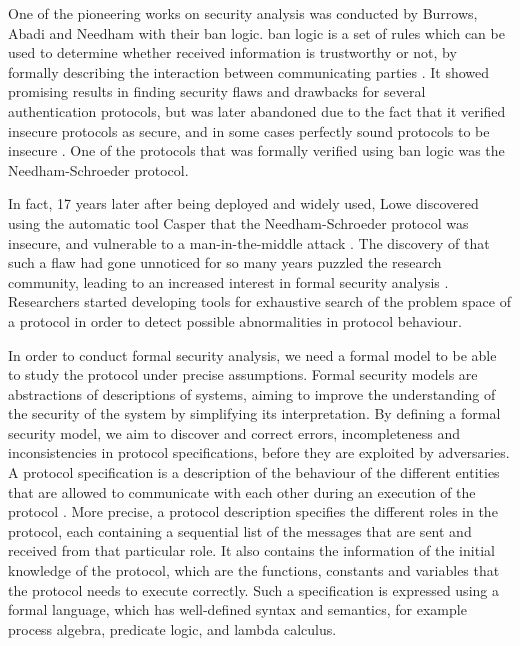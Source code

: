 One of the pioneering works on security analysis was conducted by Burrows, Abadi and Needham with their \gls{ban} logic. \gls{ban} logic is a set of rules which can be used to determine whether received information is trustworthy or not, by formally describing the interaction between communicating parties \cite{burrows1989logic}. It showed promising results in finding security flaws and drawbacks for several authentication protocols, but was later abandoned due to the fact that it verified insecure protocols as secure, and in some cases perfectly sound protocols to be insecure \cite{boyd1993}. One of the protocols that was formally verified using \gls{ban} logic was the Needham-Schroeder protocol.

In fact, 17 years later after being deployed and widely used, Lowe discovered using the automatic tool Casper that the Needham-Schroeder protocol was insecure, and vulnerable to a man-in-the-middle attack \cite{basin2011model} \cite{lowe1996}. The discovery of that such a flaw had gone unnoticed for so many years puzzled the research community, leading to an increased interest in formal security analysis \cite{cremers2009comparing}. Researchers started developing tools for exhaustive search of the problem space of a protocol in order to detect possible abnormalities in protocol behaviour. 


In order to conduct formal security analysis, we need a formal model to be able to study the protocol under precise assumptions. Formal security models are abstractions of descriptions of systems, aiming to improve the understanding of the security of the system by simplifying its interpretation. By defining a formal security model, we aim to discover and correct errors, incompleteness and inconsistencies in protocol specifications, before they are exploited by adversaries. A protocol specification is a description of the behaviour of the different entities that are allowed to communicate with each other during an execution of the protocol \cite{cremers2005operational}. More precise, a protocol description specifies the different roles in the protocol, each containing a sequential list of the messages that are sent and received from that particular role. It also contains the information of the initial knowledge of the protocol, which are the functions, constants and variables that the protocol needs to execute correctly. Such a specification is expressed using a formal language, which has well-defined syntax and semantics, for example process algebra, predicate logic, and lambda calculus. 


